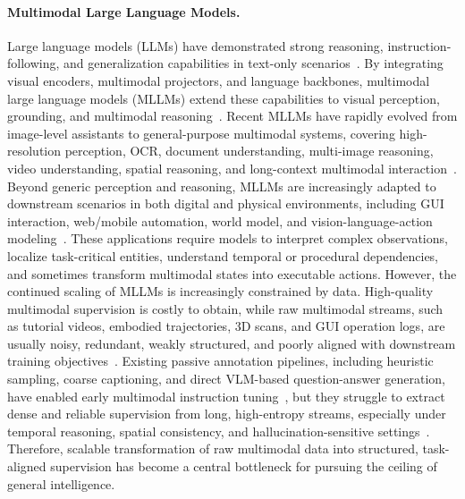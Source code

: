 \documentclass{llmxive}
\begin{document}
\paragraph{Multimodal Large Language Models.}
Large language models (LLMs) have demonstrated strong reasoning, instruction-following, and generalization capabilities in text-only scenarios~\cite{gpt4,videollama,yang2025qwen3}. By integrating visual encoders, multimodal projectors, and language backbones, multimodal large language models (MLLMs) extend these capabilities to visual perception, grounding, and multimodal reasoning~\cite{llava,chen2023minigptv2,qwen2.5vl,chen2024internvl,gpt4o,gemini2.5}. Recent MLLMs have rapidly evolved from image-level assistants to general-purpose multimodal systems, covering high-resolution perception, OCR, document understanding, multi-image reasoning, video understanding, spatial reasoning, and long-context multimodal interaction~\cite{spatialvlm,vlm4d,vlmad,vlm2bench,vsibench,mmsibench}. Beyond generic perception and reasoning, MLLMs are increasingly adapted to downstream scenarios in both digital and physical environments, including GUI interaction, web/mobile automation, world model, and vision-language-action modeling~\cite{osworld,mind2web,savva2019habitat,dai2017scannet,openvla,pi0,gr3,worldvla,wan2024grid,li2026trajectory,luo2025canonswap,retrieve,prosr}. These applications require models to interpret complex observations, localize task-critical entities, understand temporal or procedural dependencies, and sometimes transform multimodal states into executable actions. However, the continued scaling of MLLMs is increasingly constrained by data. High-quality multimodal supervision is costly to obtain, while raw multimodal streams, such as tutorial videos, embodied trajectories, 3D scans, and GUI operation logs, are usually noisy, redundant, weakly structured, and poorly aligned with downstream training objectives~\cite{grauman2022ego4d,savva2019habitat,dai2017scannet,osworld,mind2web}. Existing passive annotation pipelines, including heuristic sampling, coarse captioning, and direct VLM-based question-answer generation, have enabled early multimodal instruction tuning~\cite{sharegpt4v,gao2024sphinx,chen2023minigptv2}, but they struggle to extract dense and reliable supervision from long, high-entropy streams, especially under temporal reasoning, spatial consistency, and hallucination-sensitive settings~\cite{hallusionbench,evaluating,disheng2024thinking,mico,li2025viewspatial}. Therefore, scalable transformation of raw multimodal data into structured, task-aligned supervision has become a central bottleneck for pursuing the ceiling of general intelligence.
\end{document}
